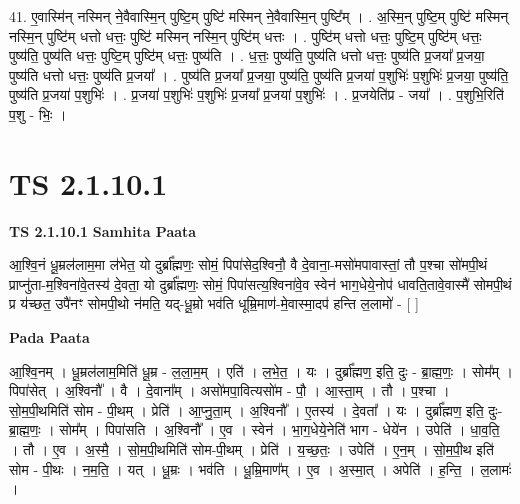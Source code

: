 \documentclass[17pt]{extarticle}
\begin{document}
41. ए॒वास्मि॑न् नस्मिन् ने॒वैवास्मि॒न् पुष्टि॒म् पुष्टि॑ मस्मिन् ने॒वैवास्मि॒न् पुष्टि᳚म् । . अ॒स्मि॒न् पुष्टि॒म् पुष्टि॑ मस्मिन् नस्मि॒न् पुष्टि॑म् धत्तो धत्तः॒ पुष्टि॑ मस्मिन् नस्मि॒न् पुष्टि॑म् धत्तः । . पुष्टि॑म् धत्तो धत्तः॒ पुष्टि॒म् पुष्टि॑म् धत्तः॒ पुष्य॑ति॒ पुष्य॑ति धत्तः॒ पुष्टि॒म् पुष्टि॑म् धत्तः॒ पुष्य॑ति । . ध॒त्तः॒ पुष्य॑ति॒ पुष्य॑ति धत्तो धत्तः॒ पुष्य॑ति प्र॒जया᳚ प्र॒जया॒ पुष्य॑ति धत्तो धत्तः॒ पुष्य॑ति प्र॒जया᳚ । . पुष्य॑ति प्र॒जया᳚ प्र॒जया॒ पुष्य॑ति॒ पुष्य॑ति प्र॒जया॑ प॒शुभिः॑ प॒शुभिः॑ प्र॒जया॒ पुष्य॑ति॒ पुष्य॑ति प्र॒जया॑ प॒शुभिः॑ । . प्र॒जया॑ प॒शुभिः॑ प॒शुभिः॑ प्र॒जया᳚ प्र॒जया॑ प॒शुभिः॑ । . प्र॒जयेति॑प्र - जया᳚ । . प॒शुभि॒रिति॑ प॒शु - भिः॒ । \newline
\pagebreak
{}
\section*{ TS 2.1.10.1 }

\textbf{TS 2.1.10.1 } \newline
\textbf{Samhita Paata} \newline

आ॒श्वि॒नं धू॒म्रल॑लाम॒मा ल॑भेत॒ यो दुर्ब्रा᳚ह्मणः॒ सोमं॒ पिपा॑सेद॒श्विनौ॒ वै दे॒वाना॒-मसो॑मपावास्तां॒ तौ प॒श्चा सो॑मपी॒थं प्राप्नु॑ता-म॒श्विना॑वे॒तस्य॑ दे॒वता॒ यो दुर्ब्रा᳚ह्मणः॒ सोमं॒ पिपा॑सत्य॒श्विना॑वे॒व स्वेन॑ भाग॒धेये॒नोप॑ धावति॒तावे॒वास्मै॑ सोमपी॒थं प्र य॑च्छत॒ उपै॑नꣳ सोमपी॒थो न॑मति॒ यद्-धू॒म्रो भव॑ति धूम्रि॒माण॑-मे॒वास्मा॒दप॑ हन्ति ल॒लामो॑ - [  ] \newline

\textbf{Pada Paata} \newline

आ॒श्वि॒नम् । धू॒म्रल॑लाम॒मिति॑ धू॒म्र - ल॒ला॒म॒म् । एति॑ । ल॒भे॒त॒ । यः । दुर्ब्रा᳚ह्मण॒ इति॒ दुः - ब्रा॒ह्म॒णः॒ । सोम᳚म् । पिपा॑सेत् । अ॒श्विनौ᳚ । वै । दे॒वाना᳚म् । असो॑मपा॒वित्यसो॑म - पौ॒ । आ॒स्ता॒म् । तौ । प॒श्चा । सो॒म॒पी॒थमिति॑ सोम - पी॒थम् । प्रेति॑ । आ॒प्नु॒ता॒म् । अ॒श्विनौ᳚ । ए॒तस्य॑ । दे॒वता᳚ । यः । दुर्ब्रा᳚ह्मण॒ इति॒ दुः- ब्रा॒ह्म॒णः॒ । सोम᳚म् । पिपा॑सति । अ॒श्विनौ᳚ । ए॒व । स्वेन॑ । भा॒ग॒धेये॒नेति॑ भाग - धेये॑न । उपेति॑ । धा॒व॒ति॒ । तौ । ए॒व । अ॒स्मै॒ । सो॒म॒पी॒थमिति॑ सोम-पी॒थम् । प्रेति॑ । य॒च्छ॒तः॒ । उपेति॑ । ए॒न॒म् । सो॒म॒पी॒थ इति॑ सोम - पी॒थः । न॒म॒ति॒ । यत् । धू॒म्रः । भव॑ति । धू॒म्रि॒माण᳚म् । ए॒व । अ॒स्मा॒त् । अपेति॑ । ह॒न्ति॒ । ल॒लामः॑ ।  \newline
\end{document}
